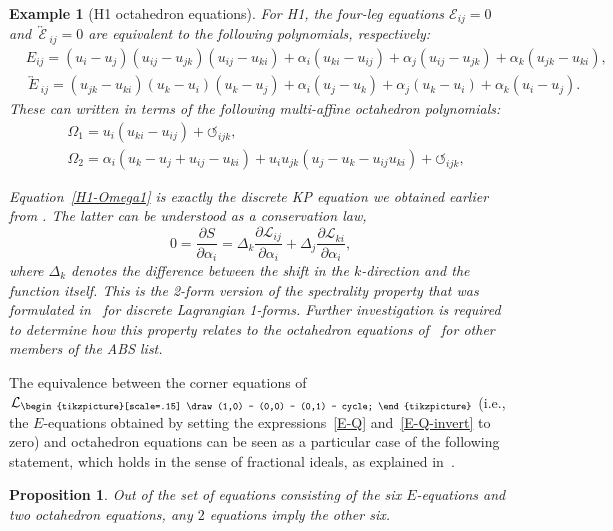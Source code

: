 \documentclass[pdftex]{sigma}
\newcommand{\inversion}[1]{\!\overleftrightarrow{\,#1\,}\!}
\newcommand{\triang}{{\begin{tikzpicture}[scale=.15]
			\draw (1,0) -- (0,0) -- (0,1) -- cycle;
\end{tikzpicture}}}
\newcommand{\cyclic}{{\circlearrowleft}_{ijk}}
\newcommand{\pdv}[2]{\frac{\partial {#1}}{\partial {#2}}}
\newcommand{\cL}{\mathcal{L}}
\newtheorem{Example}[Definition]{Example}
\newtheorem{Proposition}[Definition]{Proposition}
\numberwithin{equation}{section}
\begin{document}
\begin{Example}[H1 octahedron equations]
 For H1, the four-leg equations $\mathcal{E}_{ij} = 0$ and $\inversion{\mathcal{E}}_{ij} = 0$ are equivalent to the following polynomials, respectively:
 \begin{align*}
 &E_{ij} = (u_i - u_j) (u_{ij} - u_{jk}) (u_{ij} - u_{ki} ) + \alpha_i (u_{ki} - u_{ij} ) + \alpha_j (u_{ij} - u_{jk} ) + \alpha_k ( u_{jk} - u_{ki} ) , \\
 &\inversion{E}_{ij} = (u_{jk} - u_{ki} ) (u_k - u_i) (u_k - u_j) + \alpha_i ( u_j - u_k ) + \alpha_j (u_k - u_i ) + \alpha_k ( u_i - u_j ) .
 \end{align*}
 These can written in terms of the following multi-affine octahedron polynomials:
 \begin{align}
 &\Omega_1= u_i ( u_{ki} - u_{ij} ) + \cyclic , \label{H1-Omega1} \\
 &\Omega_2 = \alpha_i ( u_k - u_j + u_{ij} - u_{ki} ) + u_i u_{jk} ( u_j - u_k - u_{ij} u_{ki} ) + \cyclic ,\nonumber
 \end{align}

 Equation~\eqref{H1-Omega1} is exactly the discrete KP equation we obtained earlier from \smash{$\pdv{S_\triang}{\alpha_i} = 0$}. The latter can be understood as a conservation law,
 \[ 0 = \pdv{S}{\alpha_i} = \Delta_k \pdv{\cL_{ij}}{\alpha_i} + \Delta_j \pdv{\cL_{ki}}{\alpha_i} , \]
 where $\Delta_k$ denotes the difference between the shift in the $k$-direction and the function itself.
 This is the 2-form version of the \emph{spectrality property} that was formulated in~\cite{suris2013variational} for discrete Lagrangian 1-forms.
 Further investigation is required to determine how this property relates to the octahedron equations of~\cite{boll2016integrability} for other members of the ABS list.
\end{Example}

The equivalence between the corner equations of $\cL_\triang$ (i.e., the $E$-equations obtained by setting the expressions~\eqref{E-Q} and~\eqref{E-Q-invert} to zero) and octahedron equations
can be seen as a particular case of the following statement, which holds in the sense of fractional ideals, as explained in~\cite{boll2016integrability}.

\begin{Proposition}
\label{prop-2outof8}
 Out of the set of equations consisting of the six $E$-equations and two octahedron equations, any $2$ equations imply the other six.
\end{Proposition}
\end{document}
